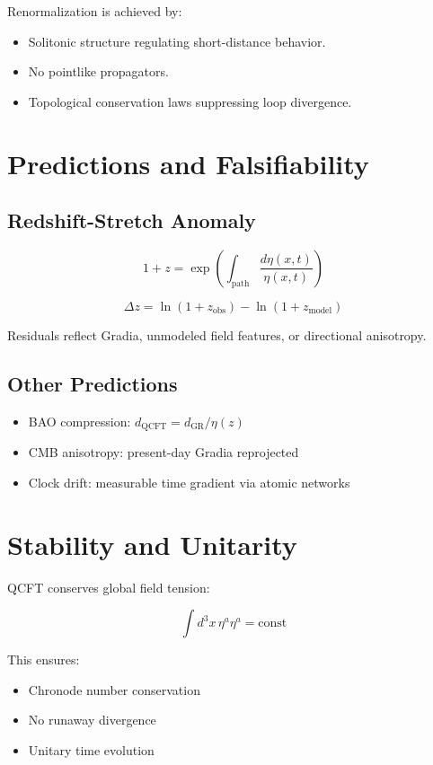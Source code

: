 \documentclass[12pt]{article}
\begin{document}
Renormalization is achieved by:

\begin{itemize}
\item Solitonic structure regulating short-distance behavior.
\item No pointlike propagators.
\item Topological conservation laws suppressing loop divergence.
\end{itemize}

\section{Predictions and Falsifiability}

\subsection*{Redshift-Stretch Anomaly}

\[
1 + z = \exp\left( \int_{\text{path}} \frac{d\eta(x,t)}{\eta(x,t)} \right)
\]

\[
\Delta z = \ln(1 + z_{\text{obs}}) - \ln(1 + z_{\text{model}})
\]

Residuals reflect Gradia, unmodeled field features, or directional anisotropy.

\subsection*{Other Predictions}

\begin{itemize}
\item BAO compression: $d_{\text{QCFT}} = d_{\text{GR}} / \eta(z)$
\item CMB anisotropy: present-day Gradia reprojected
\item Clock drift: measurable time gradient via atomic networks
\end{itemize}

\section{Stability and Unitarity}

QCFT conserves global field tension:

\[
\int d^3x \, \eta^a \eta^a = \text{const}
\]

This ensures:

\begin{itemize}
\item Chronode number conservation
\item No runaway divergence
\item Unitary time evolution
\end{itemize}
\end{document}
